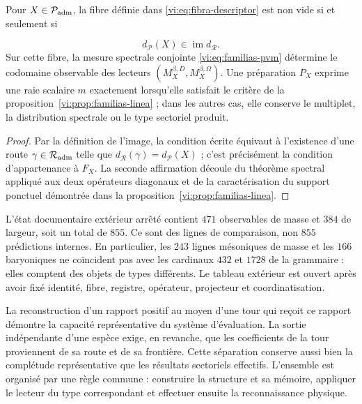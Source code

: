 \begin{proposition}
\label{vi:prop:producto-fibrado-especie-ruta}
Pour \(X\in\mathcal P_{\rm adm}\), la fibre définie dans
\eqref{vi:eq:fibra-descriptor} est non vide si et seulement si

\[
 d_{\mathcal P}(X)\in\operatorname{im}d_{\mathcal R}.
\]
Sur cette fibre, la mesure spectrale conjointe
\eqref{vi:eq:familias-pvm} détermine le codomaine observable des lecteurs
\((M_X^{\beta,D},M_X^{\beta,\Omega})\). Une préparation \(P_X\) exprime une
raie scalaire \(m\) exactement lorsqu’elle satisfait le critère de la
proposition~\ref{vi:prop:familias-linea} ; dans les autres cas, elle conserve le
multiplet, la distribution spectrale ou le type sectoriel produit.

\end{proposition}
\begin{proof}
Par la définition de l’image, la condition écrite équivaut à l’existence
d’une route \(\gamma\in\mathcal R_{\rm adm}\) telle que
\(d_{\mathcal R}(\gamma)=d_{\mathcal P}(X)\) ; c’est précisément la
condition d’appartenance à \(F_X\). La seconde affirmation découle du théorème
spectral appliqué aux deux opérateurs diagonaux et de la caractérisation
du support ponctuel démontrée dans la
proposition~\ref{vi:prop:familias-linea}.

\end{proof}

L’état documentaire extérieur arrêté contient \(471\) observables de masse et
\(384\) de largeur, soit un total de \(855\). Ce sont des lignes de comparaison, non
\(855\) prédictions internes. En particulier, les \(243\) lignes
mésoniques de masse et les \(166\) baryoniques ne coïncident pas avec les cardinaux
\(432\) et \(1728\) de la grammaire : elles comptent des objets de types différents.
Le tableau extérieur est ouvert après avoir fixé identité, fibre, registre,
opérateur, projecteur et coordinatisation.


La reconstruction d’un rapport positif au moyen d’une tour qui reçoit
ce rapport démontre la capacité représentative du système d’évaluation.
La sortie indépendante d’une espèce exige, en revanche, que les
coefficients de la tour proviennent de sa route et de sa frontière. Cette
séparation conserve aussi bien la complétude représentative que les
résultats sectoriels effectifs. L’ensemble est organisé par une
règle commune : construire la structure et sa mémoire, appliquer le lecteur
du type correspondant et effectuer ensuite la reconnaissance physique.

